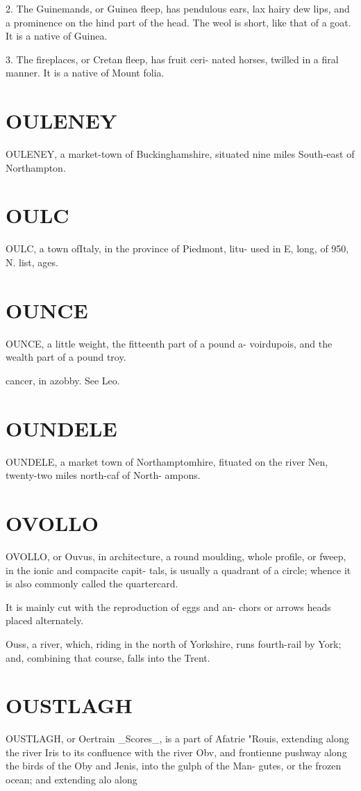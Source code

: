 \documentclass{article}
\begin{document}
2. The Guinemands, or Guinea fleep, has pendulous ears, lax hairy dew lips, and a prominence on the hind part of the head. The weol is short, like that of a goat. It is a native of Guinea.

3. The fireplaces, or Cretan fleep, has fruit ceri- nated horses, twilled in a firal manner. It is a native of Mount folia.

\section*{OULENEY}
OULENEY, a market-town of Buckinghamshire, situated nine miles South-east of Northampton.

\section*{OULC}
OULC, a town ofItaly, in the province of Piedmont, litu- used in E, long, of 950, N. list, ages.

\section*{OUNCE}
OUNCE, a little weight, the fitteenth part of a pound a- voirdupois, and the wealth part of a pound troy.

cancer, in azobby. See Leo.

\section*{OUNDELE}
OUNDELE, a market town of Northamptomhire, fituated on the river Nen, twenty-two miles north-caf of North- ampons.

\section*{OVOLLO}
OVOLLO, or Ouvus, in architecture, a round moulding, whole profile, or fweep, in the ionic and compacite capit- tals, is usually a quadrant of a circle; whence it is also commonly called the quartercard.

It is mainly cut with the reproduction of eggs and an- chors or arrows heads placed alternately.

Ouss, a river, which, riding in the north of Yorkshire, runs fourth-rail by York; and, combining that course, falls into the Trent.

\section*{OUSTLAGH}
OUSTLAGH, or Oertrain \_Scores\_, is a part of Afatrie "Rouis, extending along the river Iris to its confluence with the river Obv, and frontienne pushway along the birds of the Oby and Jenis, into the gulph of the Man- gutes, or the frozen ocean; and extending alo along
\end{document}
